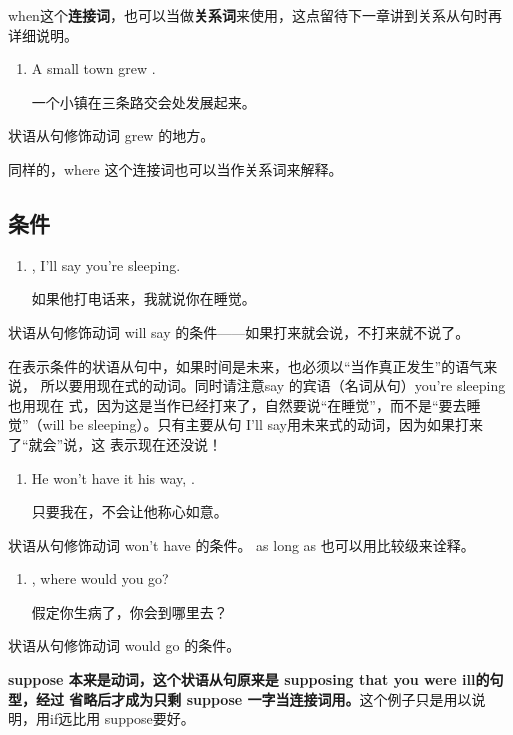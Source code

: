 when这个\textbf{连接词}，也可以当做\textbf{关系词}来使用，这点留待下一章讲到关系从句时再
详细说明。

\begin{enumerate}[resume]
\item A small town grew  .

  一个小镇在三条路交会处发展起来。
\end{enumerate}
状语从句修饰动词 grew 的地方。

同样的，where 这个连接词也可以当作关系词来解释。

\subsection{条件}

\begin{enumerate}
\item {} , I'll say you're
  sleeping.

  如果他打电话来，我就说你在睡觉。
\end{enumerate}
状语从句修饰动词 will say 的条件——如果打来就会说，不打来就不说了。

在表示条件的状语从句中，如果时间是未来，也必须以“当作真正发生”的语气来说，
所以要用现在式的动词。同时请注意say 的宾语（名词从句）you're sleeping也用现在
式，因为这是当作已经打来了，自然要说“在睡觉”，而不是“要去睡觉”（will be
sleeping）。只有主要从句 I'll say用未来式的动词，因为如果打来了“就会”说，这
表示现在还没说！

\begin{enumerate}[resume]
\item He won't have it his way,  .

  只要我在，不会让他称心如意。
\end{enumerate}
状语从句修饰动词 won't have 的条件。 as long as 也可以用比较级来诠释。

\begin{enumerate}[resume]
\item {} , where would you go?

  假定你生病了，你会到哪里去？
\end{enumerate}
状语从句修饰动词 would go 的条件。

\textbf{suppose 本来是动词，这个状语从句原来是 supposing that you were ill的句型，经过
  省略后才成为只剩 suppose 一字当连接词用。}这个例子只是用以说明，用if远比用
suppose要好。

